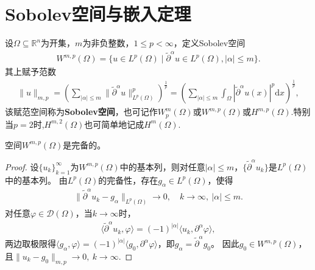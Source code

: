 \documentclass[../../main.tex]{subfiles}%
\begin{document}
\section{Sobolev空间与嵌入定理}

\begin{definition}[Sobolev空间]\label{definition:Sobolev空间}
设$\Omega\subseteq\mathbb{R}^{n}$为开集，$m$为非负整数，$1\leqslant p<\infty$，定义Sobolev空间
\begin{align*}
W^{m,p}(\Omega)=\{u\in L^{p}(\Omega)\mid \widetilde{\partial}^{\alpha}u\in L^{p}(\Omega),|\alpha|\leqslant m\}.
\end{align*}
其上赋予范数
\begin{align*}
\|u\|_{m,p}=\left(\sum\limits_{|\alpha|\leqslant m}\|\widetilde{\partial}^{\alpha}u\|_{L^{p}(\Omega)}^{p}\right)^{\frac{1}{p}}=\left(\sum\limits_{|\alpha|\leqslant m}\int_{\Omega}|\widetilde{\partial}^{\alpha}u(x)|^{p}\mathrm{d}x\right)^{\frac{1}{p}},
\end{align*}
该赋范空间称为\textbf{Sobolev空间}，也可记作$W_{p}^{m}(\Omega)$或$W^{m,p}(\Omega)$或$H^{m,p}(\Omega)$.特别当$p=2$时,$H^{m,2}(\Omega)$也可简单地记成$H^{m}(\Omega)$.
\end{definition}

\begin{theorem}
空间$W^{m,p}(\Omega)$是完备的。
\end{theorem}

\begin{proof}

设$\{u_{k}\}_{k=1}^{\infty}$为$W^{m,p}(\Omega)$中的基本列，则对任意$|\alpha|\leqslant m$，$\{\widetilde{\partial}^{\alpha}u_{k}\}$是$L^{p}(\Omega)$中的基本列。
由$L^{p}(\Omega)$的完备性，存在$g_{\alpha}\in L^{p}(\Omega)$，使得
\begin{align*}
\|\widetilde{\partial}^{\alpha}u_{k}-g_{\alpha}\|_{L^{p}(\Omega)}\to 0,\quad k\to\infty,\ |\alpha|\leqslant m.
\end{align*}
对任意$\varphi\in\mathscr{D}(\Omega)$，当$k\to\infty$时，
\begin{align*}
\langle\widetilde{\partial}^{\alpha}u_{k},\varphi\rangle=(-1)^{|\alpha|}\langle u_{k},\partial^{\alpha}\varphi\rangle,
\end{align*}
两边取极限得$\langle g_{\alpha},\varphi\rangle=(-1)^{|\alpha|}\langle g_{0},\partial^{\alpha}\varphi\rangle$，即$g_{\alpha}=\widetilde{\partial}^{\alpha}g_{0}$。
因此$g_{0}\in W^{m,p}(\Omega)$，且$\|u_{k}-g_{0}\|_{m,p}\to 0,\ k\to\infty$.

\end{proof}
\end{document}
